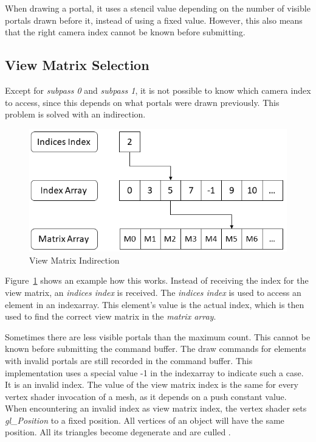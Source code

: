 When drawing a portal, it uses a stencil value depending on the number of visible portals drawn before it, instead of using a fixed value. However, this also means that the right camera index cannot be known before submitting.


\subsection{View Matrix Selection}
\label{section:viewmatrixselection}
Except for \textit{subpass 0} and \textit{subpass 1}, it is not possible to know which camera index to access, since this depends on what portals were drawn previously. This problem is solved with an indirection.

\begin{figure}[h]
	\includegraphics[width=\linewidth]{images/viewmatrixindirection.png}
	\caption{View Matrix Indirection}
	\label{fig:viewmatrixindirection}
\end{figure}

Figure~\ref{fig:viewmatrixindirection} shows an example how this works. Instead of receiving the index for the view matrix, an \textit{indices index} is received. The \textit{indices index} is used to access an element in an \gls{indexarray}. This element's value is the actual index, which is then used to find the correct view matrix in the \textit{matrix array}.

Sometimes there are less visible portals than the maximum count. This cannot be known before submitting the command buffer. The draw commands for elements with invalid portals are still recorded in the command buffer. This implementation uses a special value -1 in the \gls{indexarray} to indicate such a case. It is an invalid index. The value of the view matrix index is the same for every vertex shader invocation of a mesh, as it depends on a push constant value. When encountering an invalid index as view matrix index, the vertex shader sets \textit{gl\_Position} to a fixed position. All vertices of an object will have the same position. All its triangles become degenerate and are culled \cite{khronos:vulkan:spec1.1}.

